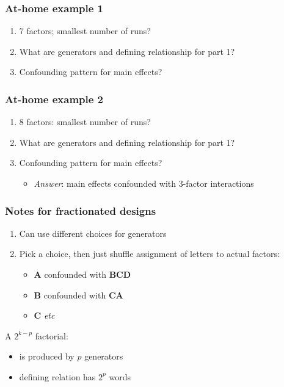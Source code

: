 \begin{frame}\frametitle{At-home example 1}
	\begin{enumerate}
		\item	7 factors; smallest number of runs?
		\item	What are generators and defining relationship for part 1?
		\item	Confounding pattern for main effects?
	\end{enumerate}
\end{frame}

\begin{frame}\frametitle{At-home example 2}
	\begin{enumerate}
		\item	8 factors: smallest number of runs?
		\item	What are generators and defining relationship for part 1?
		\item	Confounding pattern for main effects?
		\begin{itemize}
			\item	\emph{Answer}: main effects confounded with 3-factor interactions
		\end{itemize}
	\end{enumerate}
\end{frame}

\begin{frame}\frametitle{Notes for fractionated designs}
	\begin{enumerate}
		\item	Can use different choices for generators
		\item	Pick a choice, then just shuffle assignment of letters to actual factors:
		\begin{itemize}
			\item	\textbf{A} confounded with \textbf{BCD}
			\item	\textbf{B} confounded with \textbf{CA}
			\item	\textbf{C} \emph{etc}
		\end{itemize}
	\end{enumerate}

	A $2^{k-p}$ factorial:
	\begin{itemize}
		\item	is produced by $p$ generators
		\item	defining relation has $2^p$ words
	\end{itemize}
\end{frame}


